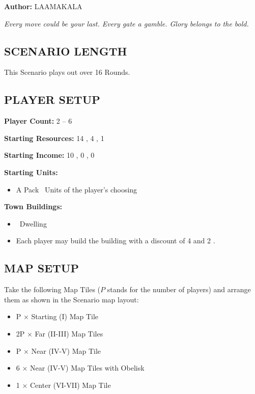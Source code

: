 
\begin{multicols}{2}

\textbf{Author:} LAAMAKALA

\textit{Every move could be your last. Every gate a gamble. Glory belongs to the bold.}

\subsection*{\MakeUppercase{Scenario Length}}
This Scenario plays out over 16 Rounds.

\subsection*{\MakeUppercase{Player Setup}}
\textbf{Player Count:} 2 -- 6

\textbf{Starting Resources:} 14 , 4 , 1 

\textbf{Starting Income:} 10 , 0 , 0 

\textbf{Starting Units:}

\begin{itemize}
  \item A Pack \bronze\ Units of the player's choosing
\end{itemize}

\textbf{Town Buildings:}
\begin{itemize}
  \item \bronze\ Dwelling
  \item Each player may build the  building with a discount of 4  and 2 .
\end{itemize}

\subsection*{\MakeUppercase{Map Setup}}
Take the following Map Tiles ($P$ stands for the number of players) and arrange them as shown in the Scenario map layout:

\begin{itemize}
  \item P × Starting (I) Map Tile
  \item 2P × Far (II-III) Map Tiles
  \item P × Near (IV-V) Map Tile
  \item 6 × Near (IV-V) Map Tiles with Obelisk
  \item 1 × Center (VI-VII) Map Tile
\end{itemize}


\end{multicols}
